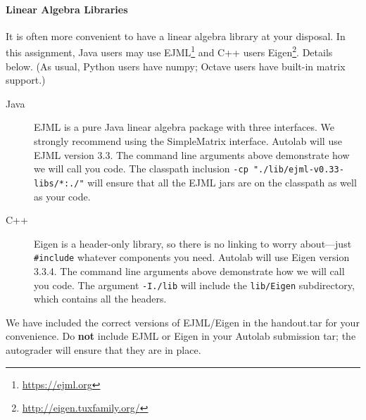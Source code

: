 
\begin{notebox}
\paragraph{Linear Algebra Libraries} It is often more convenient to have a linear algebra library at your disposal. In this assignment, Java users may use EJML\footnote{\url{https://ejml.org}} and C++ users Eigen\footnote{\url{http://eigen.tuxfamily.org/}}. Details below. 
%
(As usual, Python users have numpy; Octave users have built-in matrix support.)
%
\begin{description}
\item[Java] EJML is a pure Java linear algebra package with three interfaces. We strongly recommend using the SimpleMatrix interface. Autolab will use EJML version 3.3. The command line arguments above demonstrate how we will call you code. The classpath inclusion \lstinline{-cp "./lib/ejml-v0.33-libs/*:./"} will ensure that all the EJML jars are on the classpath as well as your code. 
\item[C++] Eigen is a header-only library, so there is no linking to worry about---just \lstinline{#include} whatever components you need. Autolab will use Eigen version 3.3.4. The command line arguments above demonstrate how we will call you code. The argument \lstinline{-I./lib} will include the \lstinline{lib/Eigen} subdirectory, which contains all the headers.
\end{description} 
We have included the correct versions of EJML/Eigen in the handout.tar for your convenience. Do {\bf not} include EJML or Eigen in your Autolab submission tar; the autograder will ensure that they are in place. 
\end{notebox}
